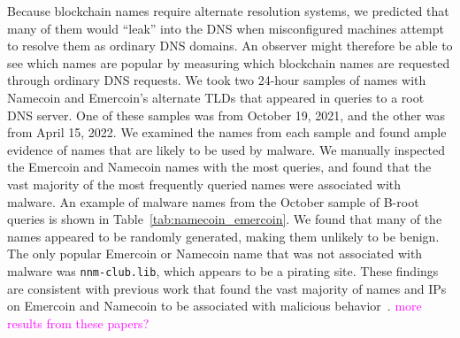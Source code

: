 \documentclass[10pt,sigconf,letterpaper]{acmart}
\newcommand{\randall}{\ding{110}\ding{43}\textcolor{magenta}}
\newcommand{\randall}{}
\begin{document}
Because blockchain names require alternate resolution systems, we predicted 
that many of them would ``leak'' into the DNS when misconfigured machines 
attempt to resolve them as ordinary DNS domains. An observer might therefore be 
able to see which names are popular by measuring which blockchain names are 
requested through ordinary DNS requests. We took two 24-hour samples of names 
with Namecoin and Emercoin's alternate TLDs that appeared in 
queries to a root DNS server. One of these samples was from October 19, 2021, 
and the other was from April 15, 2022. We examined the names from each sample 
and found ample evidence of names that are likely to be used by malware. We manually inspected 
the Emercoin and Namecoin names with the most queries, and found that the vast majority of the most 
frequently queried names were associated with malware. An example of malware names from the October 
sample of B-root queries is shown in Table~\ref{tab:namecoin_emercoin}. We found that many of the 
names appeared to be randomly generated, making them unlikely to be benign. The only popular Emercoin 
or Namecoin name that was not associated with malware was \texttt{nnm-club.lib}, which appears to be a 
pirating site. These findings are consistent with previous work that found the vast majority of names 
and IPs on Emercoin and Namecoin to be associated with malicious 
behavior~\cite{patsakis_unravelling_2020, casino_unearthing_2021}. \randall{more results from these 
papers?}


\end{document}
